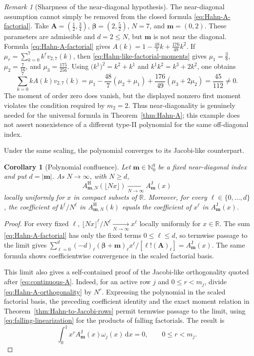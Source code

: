 \documentclass[10pt]{amsart}
\newcommand{\Nzero}{\mathbb N_0}
\newcommand{\R}{\mathbb R}
\newcommand{\dd}{\,\mathrm d}
\newcommand{\A}{\boldsymbol A}
\newcommand{\bbeta}{\boldsymbol\beta}
\newcommand{\mm}{\boldsymbol m}
\newcommand{\abs}[1]{\lvert#1\rvert}
\newcommand{\fall}[2]{#1^{\underline{#2}}}
\theoremstyle{plain}
\newtheorem{corollary}[theorem]{Corollary}
\theoremstyle{definition}
\theoremstyle{remark}
\newtheorem{remark}[theorem]{Remark}
\begin{document}
\begin{remark}[Sharpness of the near-diagonal hypothesis]
\label{rem:Hahn-near-diagonal-sharpness}
The near-diagonal assumption cannot simply be removed from the closed
formula \eqref{eq:Hahn-A-factorial}. Take
\(\A=(\frac12,\frac34)\), \(\bbeta=(2,\frac52)\), \(N=7\), and
\(\mm=(0,2)\).
These parameters are admissible and \(d=2\le N\), but \(\mm\) is not
near the diagonal. Formula \eqref{eq:Hahn-A-factorial} gives
\(A(k)=1-\frac{48}{7}k+\frac{176}{49}\fall{k}{2}\).
If
\(\mu_r=\sum_{k=0}^7\fall{k}{r}v_{2,7}(k)\), then
\eqref{eq:Hahn-like-factorial-moments} gives \(\mu_1=\frac38\),
\(\mu_2=\frac7{16}\), and \(\mu_3=\frac{175}{256}\).
Using \(\bigl(\fall{k}{1}\bigr)^2=\fall{k}{2}+\fall{k}{1}\) and
\(\fall{k}{1}\fall{k}{2}=\fall{k}{3}+2\fall{k}{2}\), one obtains
\[
 \sum_{k=0}^7 kA(k)v_{2,7}(k)
 =\mu_1-\frac{48}{7}(\mu_2+\mu_1)
  +\frac{176}{49}(\mu_3+2\mu_2)
 =\frac{45}{112}\ne0.
\]
The moment of order zero does vanish, but the displayed nonzero first
moment violates the condition required by \(m_2=2\).  Thus
near-diagonality is genuinely needed for the universal formula in
Theorem~\ref{thm:Hahn-A}; this example does not assert nonexistence of a
different type-II polynomial for the same off-diagonal index.
\end{remark}

Under the same scaling, the polynomial converges to its Jacobi-like
counterpart.

\begin{corollary}[Polynomial confluence]
\label{cor:Hahn-Jacobi-polynomial-confluence}
Let \(\mm\in\Nzero^q\) be a fixed near-diagonal index and put
\(d=\abs\mm\). As \(N\to\infty\), with \(N\ge d\),
\[
 A^{\mathrm H}_{\mm,N}(\lfloor Nx\rfloor)
 \xrightarrow[N\to\infty]{} A^{\mathrm J}_{\mm}(x)
\]
locally uniformly for \(x\) in compact subsets of \(\R\). Moreover, for
every \(\ell\in\{0,\ldots,d\}\), the coefficient of
\(\fall{k}{\ell}/\fall{N}{\ell}\) in
\(A^{\mathrm H}_{\mm,N}(k)\) equals the coefficient of \(x^\ell\) in
\(A^{\mathrm J}_{\mm}(x)\).
\end{corollary}

\begin{proof}
For every fixed \(\ell\),
\(\fall{\lfloor Nx\rfloor}{\ell}/\fall{N}{\ell}
\xrightarrow[N\to\infty]{} x^\ell\) locally uniformly for \(x\in\R\). The sum
\eqref{eq:Hahn-A-factorial} has only the fixed terms
\(0\le\ell\le d\), so termwise passage to the limit gives
\(\sum_{\ell=0}^d(-d)_\ell(\bbeta+\mm)_\ell
x^\ell/[\ell!(\A)_\ell]=A^{\mathrm J}_{\mm}(x)\).
The same formula shows coefficientwise convergence in the scaled
factorial basis.

This limit also gives a self-contained proof of the Jacobi-like
orthogonality quoted after \eqref{eq:continuous-A}. Indeed, for an active
row \(j\) and \(0\le r<m_j\), divide
\eqref{eq:Hahn-A-orthogonality} by \(N^r\). Expressing the polynomial in
the scaled factorial basis, the preceding coefficient identity and the
exact moment relation in Theorem~\ref{thm:Hahn-to-Jacobi-rows} permit
termwise passage to the limit, using
\eqref{eq:falling-linearization} for the products of falling factorials.
The result is
\[
 \int_0^1x^rA_{\mm}^{\mathrm J}(x)\omega_j(x)\dd x=0,
 \qquad 0\le r<m_j.
\]
\end{proof}
\end{document}
